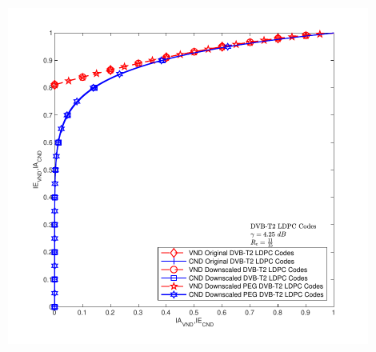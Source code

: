 \begin{figure}[H]
	\centering
	\begin{minipage}{1\linewidth}
		\hspace{0.75 cm}
		\includegraphics[width=0.85\textwidth]{pics/exit/34/34semua=snr4,25Ich=0,8113.pdf}
		\vspace{-1cm}
		

\end{minipage}
\end{figure}
